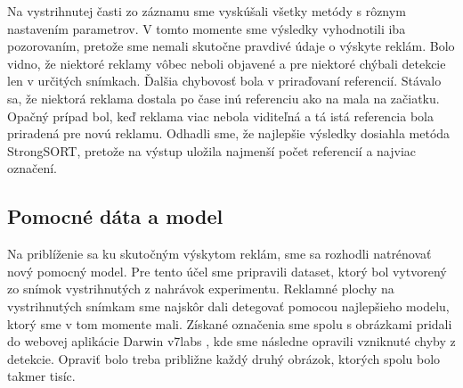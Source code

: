 Na vystrihnutej časti zo záznamu sme vyskúšali všetky metódy s rôznym nastavením parametrov. V tomto momente sme výsledky vyhodnotili iba pozorovaním, pretože sme nemali skutočne pravdivé údaje o výskyte reklám. Bolo vidno, že niektoré reklamy vôbec neboli objavené a pre niektoré chýbali detekcie len v určitých snímkach. Ďalšia chybovosť bola v priraďovaní referencií. Stávalo sa, že niektorá reklama dostala po čase inú referenciu ako na mala na začiatku. Opačný prípad bol, keď reklama viac nebola viditeľná a tá istá referencia bola priradená pre novú reklamu. Odhadli sme, že najlepšie výsledky dosiahla metóda StrongSORT, pretože na výstup uložila najmenší počet referencií a najviac označení.


\subsection{Pomocné dáta a model}

Na priblíženie sa ku skutočným výskytom reklám, sme sa rozhodli natrénovať nový pomocný model. Pre tento účel sme pripravili dataset, ktorý bol vytvorený zo snímok vystrihnutých z nahrávok experimentu. Reklamné plochy na vystrihnutých snímkam sme najskôr dali detegovať pomocou najlepšieho modelu, ktorý sme v tom momente mali. Získané označenia sme spolu s obrázkami pridali do webovej aplikácie Darwin v7labs \cite{v7}, kde sme následne opravili vzniknuté chyby z detekcie. Opraviť bolo treba približne každý druhý obrázok, ktorých spolu bolo takmer tisíc.

